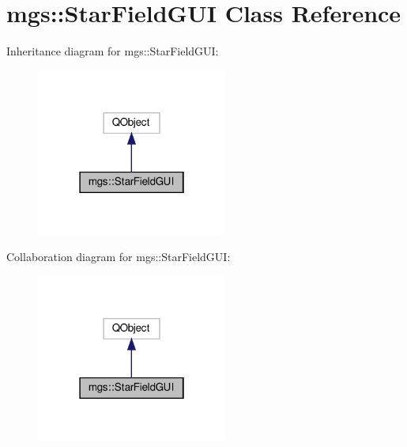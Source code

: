 \hypertarget{classmgs_1_1StarFieldGUI}{}\section{mgs\+:\+:Star\+Field\+G\+UI Class Reference}
\label{classmgs_1_1StarFieldGUI}


Inheritance diagram for mgs\+:\+:Star\+Field\+G\+UI\+:
\nopagebreak
\begin{figure}[H]
\begin{center}
\leavevmode
\includegraphics[width=178pt]{classmgs_1_1StarFieldGUI__inherit__graph}
\end{center}
\end{figure}


Collaboration diagram for mgs\+:\+:Star\+Field\+G\+UI\+:
\nopagebreak
\begin{figure}[H]
\begin{center}
\leavevmode
\includegraphics[width=178pt]{classmgs_1_1StarFieldGUI__coll__graph}
\end{center}
\end{figure}
